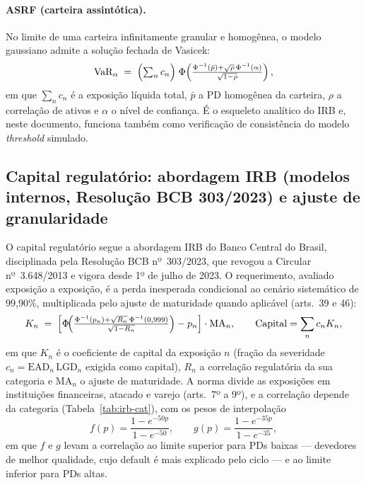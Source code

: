 \documentclass[11pt,a4paper]{article}
\newcommand{\VaR}{\mathrm{VaR}}
\begin{document}
\paragraph{ASRF (carteira assintótica).} No limite de uma carteira infinitamente granular e homogênea, o modelo gaussiano admite a solução fechada de Vasicek:
\begin{equation}
\VaR_\alpha \;=\; \Bigl(\textstyle\sum_n c_n\Bigr)\;
\Phi\!\left(\frac{\Phi^{-1}(\bar p)+\sqrt{\rho}\,\Phi^{-1}(\alpha)}{\sqrt{1-\rho}}\right),
\label{eq:vasicek}
\end{equation}
em que $\sum_n c_n$ é a exposição líquida total, $\bar p$ a PD homogênea da carteira, $\rho$ a correlação de ativos e $\alpha$ o nível de confiança. É o esqueleto analítico do IRB e, neste documento, funciona também como verificação de consistência do modelo \emph{threshold} simulado.

\subsection{Capital regulatório: abordagem IRB (modelos internos, Resolução BCB 303/2023) e ajuste de granularidade}
\label{sec:irb}

O capital regulatório segue a abordagem IRB do Banco Central do Brasil, disciplinada pela Resolução BCB nº~303/2023, que revogou a Circular nº~3.648/2013 e vigora desde 1º de julho de 2023. O requerimento, avaliado exposição a exposição, é a perda inesperada condicional ao cenário sistemático de 99{,}90\%, multiplicada pelo ajuste de maturidade quando aplicável (arts.~39 e 46):
\begin{equation}
K_n \;=\;
\Bigl[
\Phi\!\Bigl(\tfrac{\Phi^{-1}(p_n)+\sqrt{R_n}\,\Phi^{-1}(0{,}999)}{\sqrt{1-R_n}}\Bigr)
- p_n
\Bigr]\cdot \mathrm{MA}_n,
\qquad
\mathrm{Capital}=\sum_n c_n K_n,
\label{eq:irbK}
\end{equation}
em que $K_n$ é o coeficiente de capital da exposição $n$ (fração da severidade $c_n=\mathrm{EAD}_n\,\mathrm{LGD}_n$ exigida como capital), $R_n$ a correlação regulatória da sua categoria e $\mathrm{MA}_n$ o ajuste de maturidade. A norma divide as exposições em instituições financeiras, atacado e varejo (arts.~7º a 9º), e a correlação depende da categoria (Tabela~\ref{tab:irb-cat}), com os pesos de interpolação
\begin{equation}
f(p)=\frac{1-e^{-50p}}{1-e^{-50}},
\qquad
g(p)=\frac{1-e^{-35p}}{1-e^{-35}},
\end{equation}
em que $f$ e $g$ levam a correlação ao limite superior para PDs baixas --- devedores de melhor qualidade, cujo default é mais explicado pelo ciclo --- e ao limite inferior para PDs altas.
\end{document}
